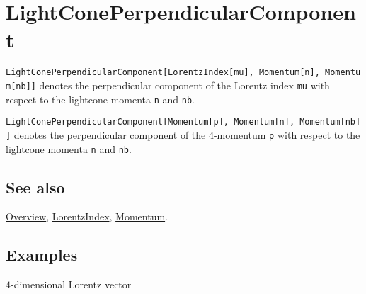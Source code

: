 \documentclass[../FeynCalcManual.tex]{subfiles}
\begin{document}
\begin{Shaded}
\begin{Highlighting}[]
 
\end{Highlighting}
\end{Shaded}

\hypertarget{lightconeperpendicularcomponent}{
\section{LightConePerpendicularComponent}\label{lightconeperpendicularcomponent}}

\texttt{LightConePerpendicularComponent[\allowbreak{}LorentzIndex[\allowbreak{}mu],\ \allowbreak{}Momentum[\allowbreak{}n],\ \allowbreak{}Momentum[\allowbreak{}nb]]}
denotes the perpendicular component of the Lorentz index \texttt{mu}
with respect to the lightcone momenta \texttt{n} and \texttt{nb}.

\texttt{LightConePerpendicularComponent[\allowbreak{}Momentum[\allowbreak{}p],\ \allowbreak{}Momentum[\allowbreak{}n],\ \allowbreak{}Momentum[\allowbreak{}nb]]}
denotes the perpendicular component of the 4-momentum \texttt{p} with
respect to the lightcone momenta \texttt{n} and \texttt{nb}.

\subsection{See also}

\hyperlink{toc}{Overview}, \hyperlink{lorentzindex}{LorentzIndex},
\hyperlink{momentum}{Momentum}.

\subsection{Examples}

\(4\)-dimensional Lorentz vector

\begin{Shaded}
\begin{Highlighting}[]
\OperatorTok{[}\OperatorTok{[}\OperatorTok{[}\SpecialCharTok{\textbackslash{}}\OperatorTok{[}\OperatorTok{]],}\OperatorTok{[}\OperatorTok{],}\OperatorTok{[}\OperatorTok{]],} 
\OperatorTok{[}\OperatorTok{[}\OperatorTok{],}\OperatorTok{[}\OperatorTok{],}\OperatorTok{[}\OperatorTok{]]]}
\end{Highlighting}
\end{Shaded}
\end{document}
